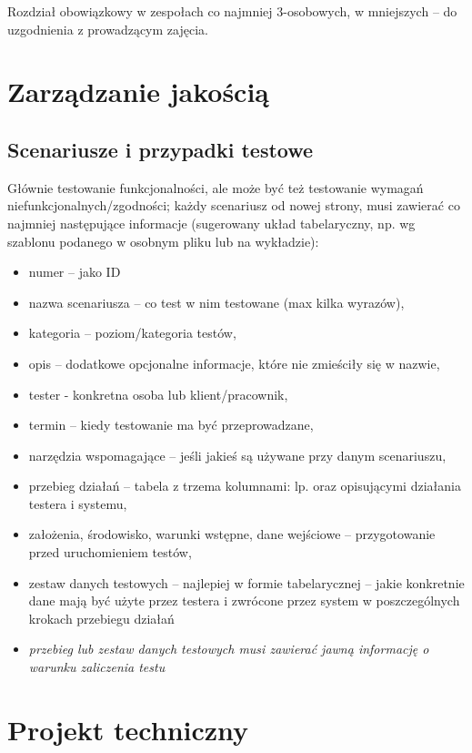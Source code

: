 \documentclass[a4paper,12pt]{article}
\begin{document}
Rozdział obowiązkowy w zespołach co najmniej 3-osobowych, w mniejszych – do uzgodnienia z prowadzącym zajęcia.

\newpage

\section{Zarządzanie jakością}
\subsection{Scenariusze i przypadki testowe}

Głównie testowanie funkcjonalności, ale może być też testowanie wymagań niefunkcjonalnych/zgodności; każdy scenariusz od nowej strony, musi zawierać co najmniej następujące informacje (sugerowany układ tabelaryczny, np. wg szablonu podanego w osobnym pliku lub na wykładzie):

\begin{itemize}
    \item numer – jako ID
    \item nazwa scenariusza – co test w nim testowane (max kilka wyrazów),
    \item kategoria – poziom/kategoria testów,
    \item opis – dodatkowe opcjonalne informacje, które nie zmieściły się w nazwie,
    \item tester - konkretna osoba lub klient/pracownik,
    \item termin – kiedy testowanie ma być przeprowadzane,
    \item narzędzia wspomagające – jeśli jakieś są używane przy danym scenariuszu,
    \item przebieg działań – tabela z trzema kolumnami: lp. oraz opisującymi działania testera i systemu,
    \item założenia, środowisko, warunki wstępne, dane wejściowe – przygotowanie przed uruchomieniem testów,
    \item zestaw danych testowych – najlepiej w formie tabelarycznej – jakie konkretnie dane mają być użyte przez testera i zwrócone przez system w poszczególnych krokach przebiegu działań
    \item \textit{przebieg lub zestaw danych testowych musi zawierać jawną informację o warunku zaliczenia testu}
\end{itemize}



\newpage

\section{Projekt techniczny}
\end{document}
